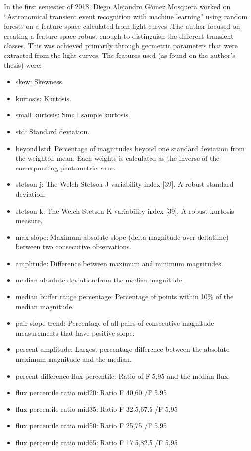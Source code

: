 In the first semester of 2018, Diego Alejandro G\'omez Mosquera worked on ``Astronomical transient event recognition with machine learning'' using random forests on a feature space calculated from light curves \cite{diegoThesis}.The author focused on creating a feature space robust enough to distinguish the different transient classes. This was achieved primarily through geometric parameters that were extracted from the light curves. The features used (as found on the author's thesis) were: 
\begin{itemize}
  \item skew: Skewness.
  \item kurtosis: Kurtosis.
  \item small kurtosis: Small sample kurtosis.
  \item std: Standard deviation.
  \item beyond1std: Percentage of magnitudes beyond one standard deviation from the weighted mean. Each weights is calculated as the inverse of the corresponding photometric error.
  \item stetson j: The Welch-Stetson J variability index [39]. A robust standard deviation.
  \item stetson k: The Welch-Stetson K variability index [39]. A robust kurtosis measure.
  \item max slope: Maximum absolute slope (delta magnitude over deltatime) between two consecutive observations.
  \item amplitude: Difference between maximum and minimum magnitudes.
  \item median absolute deviation:from the median magnitude.
  \item median buffer range percentage: Percentage of points within 10\% of the median magnitude.
  \item pair slope trend: Percentage of all pairs of consecutive magnitude measurements that have positive slope.
  \item percent amplitude: Largest percentage difference between the absolute maximum magnitude and the median.
  \item percent difference flux percentile: Ratio of F 5,95 and the median flux.
  \item flux percentile ratio mid20: Ratio F 40,60 /F 5,95
  \item flux percentile ratio mid35: Ratio F 32.5,67.5 /F 5,95
  \item flux percentile ratio mid50: Ratio F 25,75 /F 5,95
  \item flux percentile ratio mid65: Ratio F 17.5,82.5 /F 5,95

\end{itemize}
